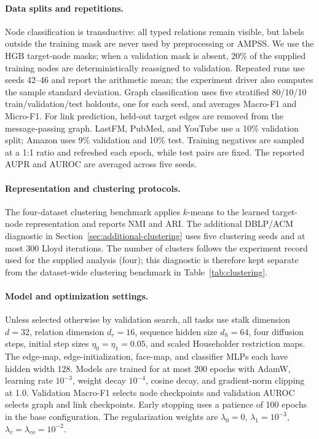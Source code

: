 \paragraph{Data splits and repetitions.}
Node classification is transductive: all typed relations remain visible, but labels outside the
training mask are never used by preprocessing or AMPSS. We use the HGB target-node masks; when a
validation mask is absent, 20\% of the supplied training nodes are deterministically reassigned to
validation. Repeated runs use seeds 42--46 and report the arithmetic mean; the experiment driver
also computes the sample standard deviation. Graph classification uses five stratified
80/10/10 train/validation/test holdouts, one for each seed, and averages Macro-F1 and Micro-F1.
For link prediction, held-out target edges are removed from the message-passing graph. LastFM,
PubMed, and YouTube use a 10\% validation split; Amazon uses 9\% validation and 10\% test. Training
negatives are sampled at a 1:1 ratio and refreshed each epoch, while test pairs are fixed. The
reported AUPR and AUROC are averaged across five seeds.

\paragraph{Representation and clustering protocols.}
The four-dataset clustering benchmark applies $k$-means to the learned target-node representation
and reports NMI and ARI. The additional DBLP/ACM diagnostic in
Section~\ref{sec:additional-clustering} uses five clustering seeds and at most 300 Lloyd iterations.
The number of clusters follows the experiment record used for the supplied analysis (four); this
diagnostic is therefore kept separate from the dataset-wide clustering benchmark in
Table~\ref{tab:clustering}.

\paragraph{Model and optimization settings.}
Unless selected otherwise by validation search, all tasks use stalk dimension $d=32$, relation
dimension $d_r=16$, sequence hidden size $d_h=64$, four diffusion steps, initial step sizes
$\eta_0=\eta_1=0.05$, and scaled Householder restriction maps. The edge-map, edge-initialization,
face-map, and classifier MLPs each have hidden width 128. Models are trained for at most 200 epochs
with AdamW, learning rate $10^{-3}$, weight decay $10^{-4}$, cosine decay, and gradient-norm
clipping at 1.0. Validation Macro-F1 selects node checkpoints and validation AUROC selects graph
and link checkpoints. Early stopping uses a patience of 100 epochs in the base configuration.
The regularization weights are $\lambda_0=0$, $\lambda_1=10^{-3}$,
$\lambda_c=\lambda_{co}=10^{-2}$.

